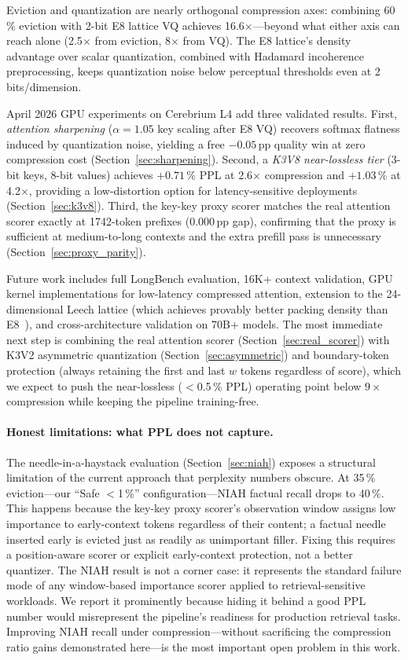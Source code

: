 \documentclass{article}
\begin{document}
Eviction and quantization are nearly orthogonal compression axes: combining
60\,\% eviction with 2-bit E8 lattice VQ achieves 16.6$\times$---beyond what
either axis can reach alone (2.5$\times$ from eviction, 8$\times$ from VQ).
The E8 lattice's density advantage over scalar quantization, combined with
Hadamard incoherence preprocessing, keeps quantization noise below perceptual
thresholds even at 2 bits/dimension.

April 2026 GPU experiments on Cerebrium L4 add three validated results.
First, \emph{attention sharpening} ($\alpha{=}1.05$ key scaling after E8 VQ)
recovers softmax flatness induced by quantization noise, yielding a free
$-0.05$\,pp quality win at zero compression cost
(Section~\ref{sec:sharpening}).
Second, a \emph{K3V8 near-lossless tier} (3-bit keys, 8-bit values) achieves
$+0.71$\,\% PPL at 2.6$\times$ compression and $+1.03$\,\% at 4.2$\times$,
providing a low-distortion option for latency-sensitive deployments
(Section~\ref{sec:k3v8}).
Third, the key-key proxy scorer matches the real attention scorer exactly at
1742-token prefixes (0.000\,pp gap), confirming that the proxy is sufficient
at medium-to-long contexts and the extra prefill pass is unnecessary
(Section~\ref{sec:proxy_parity}).

Future work includes full LongBench evaluation, 16K+ context validation,
GPU kernel implementations for low-latency compressed attention, extension
to the 24-dimensional Leech lattice (which achieves provably better packing
density than E8~\cite{llvq2026}), and cross-architecture validation on 70B+
models. The most immediate next step is combining the real attention scorer
(Section~\ref{sec:real_scorer}) with K3V2 asymmetric quantization
(Section~\ref{sec:asymmetric}) and boundary-token protection (always retaining
the first and last $w$ tokens regardless of score), which we expect to push
the near-lossless ($<$0.5\,\% PPL) operating point below $9\times$ compression
while keeping the pipeline training-free.

\paragraph{Honest limitations: what PPL does not capture.}
The needle-in-a-haystack evaluation (Section~\ref{sec:niah}) exposes a
structural limitation of the current approach that perplexity numbers obscure.
At 35\,\% eviction---our ``Safe $<$1\,\%'' configuration---NIAH factual
recall drops to 40\,\%.
This happens because the key-key proxy scorer's observation window assigns low
importance to early-context tokens regardless of their content; a factual
needle inserted early is evicted just as readily as unimportant filler.
Fixing this requires a position-aware scorer or explicit early-context
protection, not a better quantizer.
The NIAH result is not a corner case: it represents the standard failure mode
of any window-based importance scorer applied to retrieval-sensitive workloads.
We report it prominently because hiding it behind a good PPL number would
misrepresent the pipeline's readiness for production retrieval tasks.
Improving NIAH recall under compression---without sacrificing the
compression ratio gains demonstrated here---is the most important open
problem in this work.
\end{document}
